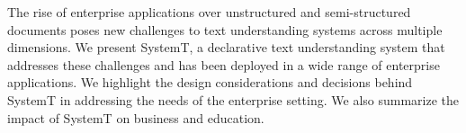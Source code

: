 The rise of enterprise applications over unstructured and semi-structured documents poses new challenges to text understanding systems across multiple dimensions. We present SystemT, a declarative text understanding system that addresses these challenges and has been deployed in a wide range of enterprise applications. We highlight the design considerations and decisions behind SystemT in addressing the needs of the enterprise setting. We also summarize the impact of SystemT on business and education.
